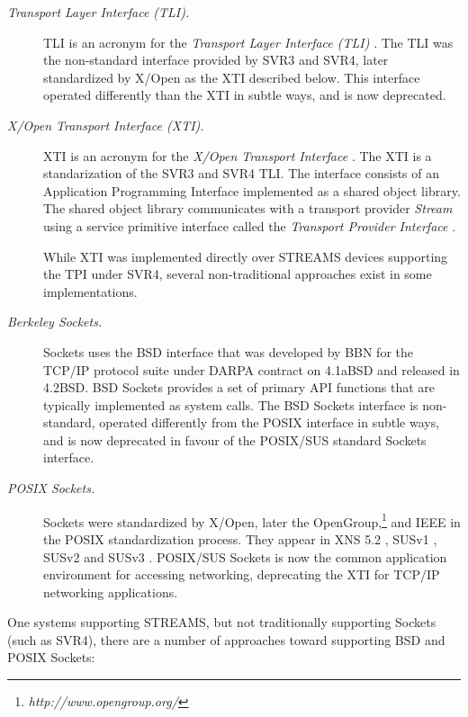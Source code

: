 \documentclass[letterpaper,final,notitlepage,twocolumn,10pt,twoside]{article}
\begin{document}
\begin{description}

\item[{\it Transport Layer Interface (TLI).}]

TLI is an acronym for the \textit{Transport Layer Interface (TLI)}
\cite[]{tli}.  The TLI was the non-standard interface provided by SVR3 and
SVR4, later standardized by X/Open as the XTI described below.  This interface
operated differently than the XTI in subtle ways, and is now deprecated.

\item[{\it X/Open Transport Interface (XTI).}]

XTI is an acronym for the \textit{X/Open Transport Interface} \cite[]{xti}.
The XTI is a standarization of the SVR3 and SVR4 TLI.  The interface consists
of an Application Programming Interface implemented as a shared object
library.  The shared object library communicates with a transport provider
\textit{Stream} using a service primitive interface called the
\textit{Transport Provider Interface} \cite[]{tpi}.

While XTI was implemented directly over STREAMS devices supporting the TPI
\cite[]{tpi} under SVR4, several non-traditional approaches exist in
some implementations.

\item[{\it Berkeley Sockets.}]

Sockets uses the BSD interface that was developed by BBN for the TCP/IP
protocol suite under DARPA contract on 4.1aBSD and released in 4.2BSD.  BSD
Sockets provides a set of primary API functions that are typically implemented
as system calls.  The BSD Sockets interface is non-standard, operated
differently from the POSIX interface in subtle ways, and is now deprecated in
favour of the POSIX/SUS standard Sockets interface.

\item[{\it POSIX Sockets.}]

Sockets were standardized by X/Open, later the
OpenGroup,\footnote{\textit{http://www.opengroup.org/}} and IEEE in the POSIX
standardization process.  They appear in XNS 5.2 \cite[]{xns}, SUSv1
\cite[]{susv1}, SUSv2 \cite[]{susv2} and SUSv3 \cite[]{susv3}.   POSIX/SUS
Sockets is now the common application environment for accessing networking,
deprecating the XTI for TCP/IP networking applications.

\end{description}

One systems supporting STREAMS, but not traditionally supporting Sockets (such
as SVR4), there are a number of approaches toward supporting BSD and POSIX
Sockets:
\end{document}
